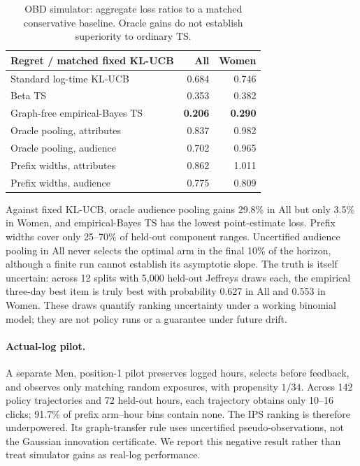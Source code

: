 \documentclass[sigconf,review,anonymous]{acmart}
\begin{document}
\begin{table}[t]\centering\small
\setlength{\tabcolsep}{4pt}
\begin{tabular}{lrr}
\toprule
Regret / matched fixed KL-UCB & All & Women \\
\midrule
Standard log-time KL-UCB & 0.684 & 0.746 \\
Beta TS & 0.353 & 0.382 \\
Graph-free empirical-Bayes TS & \textbf{0.206} & \textbf{0.290} \\
Oracle pooling, attributes & 0.837 & 0.982 \\
Oracle pooling, audience & 0.702 & 0.965 \\
Prefix widths, attributes & 0.862 & 1.011 \\
Prefix widths, audience & 0.775 & 0.809 \\
\bottomrule
\end{tabular}
\caption{OBD simulator: aggregate loss ratios to a matched conservative baseline. Oracle gains do not establish superiority to ordinary TS.}\label{tab:obd}
\end{table}

Against fixed KL-UCB, oracle audience pooling gains 29.8\% in All but only 3.5\% in Women, and empirical-Bayes TS has the lowest point-estimate loss. Prefix widths cover only 25--70\% of held-out component ranges. Uncertified audience pooling in All never selects the optimal arm in the final 10\% of the horizon, although a finite run cannot establish its asymptotic slope. The truth is itself uncertain: across 12 splits with 5,000 held-out Jeffreys draws each, the empirical three-day best item is truly best with probability 0.627 in All and 0.553 in Women. These draws quantify ranking uncertainty under a working binomial model; they are not policy runs or a guarantee under future drift.

\paragraph{Actual-log pilot.} A separate Men, position-1 pilot preserves logged hours, selects before feedback, and observes only matching random exposures, with propensity $1/34$. Across 142 policy trajectories and 72 held-out hours, each trajectory obtains only 10--16 clicks; 91.7\% of prefix arm--hour bins contain none. The IPS ranking is therefore underpowered. Its graph-transfer rule uses uncertified pseudo-observations, not the Gaussian innovation certificate. We report this negative result rather than treat simulator gains as real-log performance.
\end{document}
